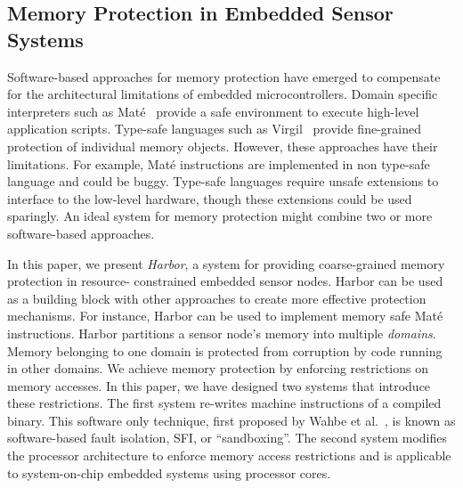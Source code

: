 \subsection{Memory Protection in Embedded Sensor Systems}
%
Software-based approaches for memory protection have emerged to
compensate for the architectural limitations of embedded
microcontrollers.
%
Domain specific interpreters such as Mat\'e~\cite{asvm05nsdi} provide
a safe environment to execute high-level application scripts.
%
Type-safe languages such as Virgil~\cite{titzer06virgil} provide
fine-grained protection of individual memory objects.
%
However, these approaches have their limitations.
%
For example, Mat\'e instructions are implemented in non type-safe
language and could be buggy.
%
Type-safe languages require unsafe extensions to interface to the
low-level hardware, though these extensions could be used sparingly.
%
An ideal system for memory protection might combine two or
more software-based approaches.
%


In this paper, we present \emph{Harbor}, a system for providing
coarse-grained memory protection in resource-%
constrained embedded sensor nodes.
%
Harbor can be used as a building block with other approaches to create
more effective protection mechanisms.
%
For instance, Harbor can be used to implement memory safe Mat\'e
instructions.
%
Harbor partitions a sensor node's memory into
multiple \textit{domains}.
%
Memory belonging to one domain is protected from corruption by code running
in other domains.
%
We achieve memory protection by enforcing restrictions on memory accesses.
%
In this paper, we have designed two systems that introduce these restrictions.
%
The first system re-writes machine instructions of a compiled binary.
%
This software only technique, first proposed by Wahbe et
al.~\cite{wahbe93sfi}, is known as software-based fault isolation,
SFI, or ``sandboxing''.
%
The second system modifies the processor architecture to enforce memory
access restrictions and is applicable to system-on-chip embedded
systems using processor cores.
%

